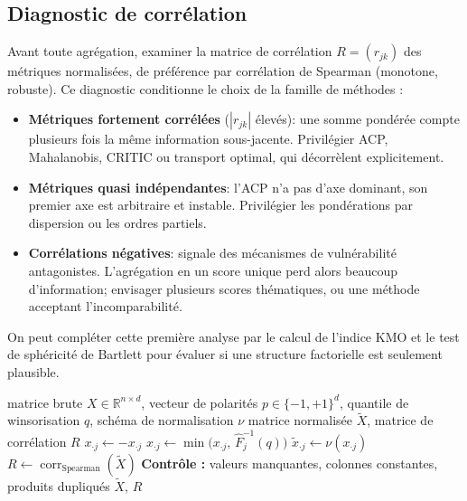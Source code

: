 \documentclass[11pt,a4paper]{article}
\theoremstyle{definition}
\theoremstyle{remark}
\newcommand{\R}{\mathbb{R}}
\newcommand{\abs}[1]{\left\lvert #1 \right\rvert}
\begin{document}
\bigskip

\subsection{Diagnostic de corrélation}

\medskip

Avant toute agrégation, examiner la matrice de corrélation $R = (r_{jk})$ des métriques
normalisées, de préférence par corrélation de Spearman (monotone, robuste). Ce diagnostic
conditionne le choix de la famille de méthodes :

\medskip

\begin{itemize}[nosep,leftmargin=1.4em]
  \item \textbf{Métriques fortement corrélées} ($\abs{r_{jk}}$ élevés): une somme pondérée compte
  plusieurs fois la même information sous-jacente. Privilégier ACP, Mahalanobis, CRITIC ou
  transport optimal, qui décorrèlent explicitement.
  \item \textbf{Métriques quasi indépendantes}: l'ACP n'a pas d'axe dominant, son premier axe est
  arbitraire et instable. Privilégier les pondérations par dispersion ou les ordres partiels.
  \item \textbf{Corrélations négatives}: signale des mécanismes de vulnérabilité antagonistes.
  L'agrégation en un score unique perd alors beaucoup d'information; envisager plusieurs scores
  thématiques, ou une méthode acceptant l'incomparabilité.
\end{itemize}

\bigskip

On peut compléter cette première analyse par le calcul de l'indice KMO et le test de sphéricité de Bartlett pour évaluer si une structure
factorielle est seulement plausible.

\bigskip

\begin{algorithm}[htbp]
  \caption{Prétraitement}
  \label{algo:pretraitement}
  \begin{algorithmic}[1]
    \Require matrice brute $X\in\R^{n\times d}$, vecteur de polarités $p\in\{-1,+1\}^d$,
    quantile de winsorisation $q$, schéma de normalisation $\nu$
    \Ensure matrice normalisée $\tilde{X}$, matrice de corrélation $R$
       $x_{\cdot j} \gets -x_{\cdot j}$ 
      \EndIf
      \State $x_{\cdot j} \gets \min\!\big(x_{\cdot j},\, \hat{F}_j^{-1}(q)\big)$
      \State $\tilde{x}_{\cdot j} \gets \nu(x_{\cdot j})$
    \EndFor
    \State $R \gets \operatorname{corr}_{\text{Spearman}}(\tilde{X})$
    \State \textbf{Contrôle :} valeurs manquantes, colonnes constantes, produits dupliqués
    \State \Return $\tilde{X}$, $R$
  \end{algorithmic}
\end{algorithm}
\end{document}
